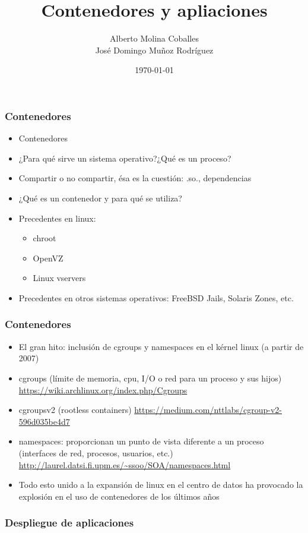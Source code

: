 \documentclass[aspectratio=169]{beamer}
\author{Alberto Molina Coballes\\
José Domingo Muñoz Rodríguez}
\title{Contenedores y apliaciones}
\institute{IES Gonzalo Nazareno}
\date{\today}
\begin{document}
\begin{frame}[t,plain]
\titlepage
\end{frame}

\begin{frame}
  \frametitle{Contenedores}
  \begin{itemize}
  \item Contenedores
  \item ¿Para qué sirve un sistema operativo?¿Qué es un proceso?
  \item Compartir o no compartir, ésa es la cuestión: .so., dependencias
  \item ¿Qué es un contenedor y para qué se utiliza?
  \item Precedentes en linux:
    \begin{itemize}
    \item chroot
    \item OpenVZ
    \item Linux vservers
    \end{itemize}
  \item Precedentes en otros sistemas operativos: FreeBSD Jails, Solaris Zones, etc.
  \end{itemize}
\end{frame}

\begin{frame}
  \frametitle{Contenedores}
  \begin{itemize}
  \item El gran hito: inclusión de cgroups y namespaces en el kérnel linux (a partir de 2007)
  \item cgroups (límite de memoria, cpu, I/O o red para un proceso y sus hijos)
    \url{https://wiki.archlinux.org/index.php/Cgroups}
  \item cgroupsv2 (rootless containers)
    \url{https://medium.com/nttlabs/cgroup-v2-596d035be4d7}
  \item namespaces: proporcionan un punto de vista diferente a un proceso (interfaces de red, procesos, usuarios, etc.)
    \url{http://laurel.datsi.fi.upm.es/~ssoo/SOA/namespaces.html}
  \item Todo esto unido a la expansión de linux en el centro de datos ha provocado la explosión en el uso de contenedores de los últimos años
  \end{itemize}
\end{frame}

\begin{frame}
  \frametitle{Despliegue de aplicaciones}
\end{frame}
\end{document}
